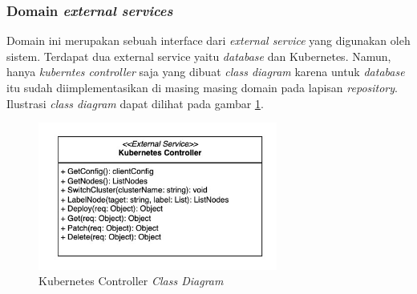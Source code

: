 \pagebreak

\subsubsection{Domain \textit{external services}}

Domain ini merupakan sebuah interface dari \textit{external service} yang digunakan oleh sistem. Terdapat dua external service yaitu \textit{database} dan Kubernetes. Namun, hanya \textit{kuberntes controller} saja yang dibuat \textit{class diagram} karena untuk \textit{database} itu sudah diimplementasikan di masing masing domain pada lapisan \textit{repository}. Ilustrasi \textit{class diagram} dapat dilihat pada gambar \ref{fig:kubernetes-controller-class-diagram}.

\begin{figure}[ht]
  \centering
  \includegraphics[width=0.7\textwidth]{resources/chapter-3/class/kubernetes-controller}
  \caption{Kubernetes Controller \textit{Class Diagram}}
  \label{fig:kubernetes-controller-class-diagram}
\end{figure}
